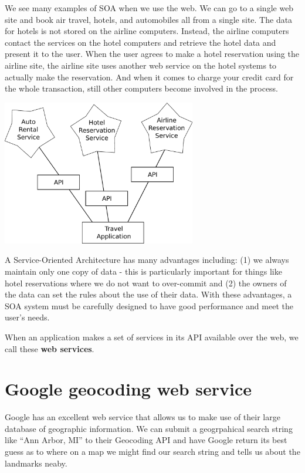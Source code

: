 \documentclass[11pt]{book}
\begin{document}
We see many examples of SOA when we use the web.  We can go to a single 
web site and book air travel, hotels, and automobiles all from a 
single site.  The data for hotels is not stored on the airline computers. 
Instead, the airline computers contact the services on the hotel computers
and retrieve the hotel data and present it to the user.  When the user
agrees to make a hotel reservation using the airline site, the airline site uses
another web service on the hotel systems to actually make the reservation.
And when it comes to charge your credit card for the whole transaction, 
still other computers become involved in the process.

\beforefig
\centerline{\includegraphics[height=2.50in]{figs2/soa.eps}}
\afterfig

A Service-Oriented Architecture has many advantages including: (1) we 
always maintain only one copy of data - this is particularly important
for things like hotel reservations where we do not want to over-commit
and (2) the owners of the data can set the rules about the use of their 
data.   With these advantages, a SOA system must be carefully designed
to have good performance and meet the user's needs.

When an application makes a set of services in its API available over the web, 
we call these {\bf web services}. 

\section{Google geocoding web service}

Google has an excellent web service that allows us to make use of their 
large database of geographic information.   We can submit a geogrpahical
search string like ``Ann Arbor, MI'' to their Geocoding API and have Google 
return its best guess as to where on a map we might find our search string and
tells us about the landmarks neaby.
\end{document}
